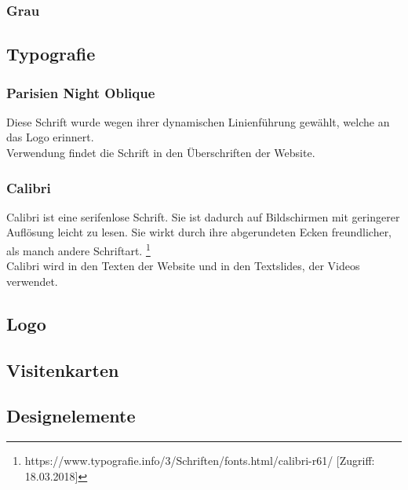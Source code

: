 \subsubsection{Grau}
\subsection{Typografie}
\subsubsection{Parisien Night Oblique}
Diese Schrift wurde wegen ihrer dynamischen Linienführung gewählt, welche an das Logo erinnert.
\\
Verwendung findet die Schrift in den Überschriften der Website.


\subsubsection{Calibri}
Calibri ist eine serifenlose Schrift. Sie ist dadurch auf Bildschirmen mit geringerer Auflösung leicht zu lesen. Sie wirkt durch ihre abgerundeten Ecken freundlicher, als manch andere Schriftart. \footnote{\label{foot:1} https://www.typografie.info/3/Schriften/fonts.html/calibri-r61/ [Zugriff: 18.03.2018]}
\\
Calibri wird in den Texten der Website und in den Textslides, der Videos verwendet.


\subsection{Logo}
\subsection{Visitenkarten}
\subsection{Designelemente}
